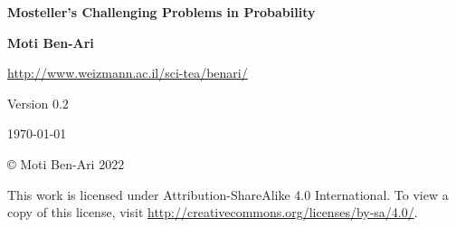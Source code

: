 

\thispagestyle{empty}

\begin{center}
\textbf{\LARGE Mosteller's Challenging Problems in Probability}

\bigskip
\bigskip
\bigskip

\textbf{\Large Moti Ben-Ari}

\bigskip

\url{http://www.weizmann.ac.il/sci-tea/benari/}

\bigskip
\bigskip

Version $0.2$

\bigskip

\today

\end{center}

\vfill

\begin{center}
\copyright{} Moti Ben-Ari $2022$
 \end{center}
 
\begin{small}
This work is licensed under Attribution-ShareAlike 4.0 International. To view a copy of this license, visit \url{http://creativecommons.org/licenses/by-sa/4.0/}.

%
%
%
%
%
%
\end{small}
\newpage

\tableofcontents

\newpage


